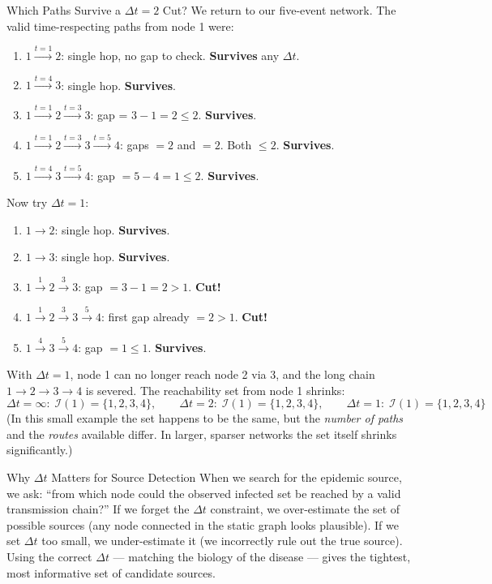 \begin{examplebox}{Which Paths Survive a $\Delta t = 2$ Cut?}
We return to our five-event network. The valid time-respecting paths from node 1 were:
\begin{enumerate}[noitemsep]
  \item $1 \xrightarrow{t=1} 2$: single hop, no gap to check. \textbf{Survives} any $\Delta t$.
  \item $1 \xrightarrow{t=4} 3$: single hop. \textbf{Survives}.
  \item $1 \xrightarrow{t=1} 2 \xrightarrow{t=3} 3$: gap = $3 - 1 = 2 \leq 2$. \textbf{Survives}.
  \item $1 \xrightarrow{t=1} 2 \xrightarrow{t=3} 3 \xrightarrow{t=5} 4$: gaps $= 2$ and $= 2$.
        Both $\leq 2$. \textbf{Survives}.
  \item $1 \xrightarrow{t=4} 3 \xrightarrow{t=5} 4$: gap $= 5 - 4 = 1 \leq 2$. \textbf{Survives}.
\end{enumerate}

Now try $\Delta t = 1$:
\begin{enumerate}[noitemsep]
  \item $1 \to 2$: single hop. \textbf{Survives}.
  \item $1 \to 3$: single hop. \textbf{Survives}.
  \item $1 \xrightarrow{1} 2 \xrightarrow{3} 3$: gap $= 3 - 1 = 2 > 1$. \textbf{Cut!}
  \item $1 \xrightarrow{1} 2 \xrightarrow{3} 3 \xrightarrow{5} 4$: first gap already $=2>1$.
        \textbf{Cut!}
  \item $1 \xrightarrow{4} 3 \xrightarrow{5} 4$: gap $= 1 \leq 1$. \textbf{Survives}.
\end{enumerate}

With $\Delta t = 1$, node 1 can no longer reach node 2 via 3, and the long chain $1 \to 2 \to
3 \to 4$ is severed. The reachability set from node 1 shrinks:
\[
  \Delta t = \infty:\; \mathcal{I}(1) = \{1,2,3,4\}, \qquad
  \Delta t = 2:\; \mathcal{I}(1) = \{1,2,3,4\}, \qquad
  \Delta t = 1:\; \mathcal{I}(1) = \{1,2,3,4\}
\]
(In this small example the set happens to be the same, but the \textit{number of paths} and
the \textit{routes} available differ. In larger, sparser networks the set itself shrinks
significantly.)
\end{examplebox}

\begin{keyinsight}{Why $\Delta t$ Matters for Source Detection}
When we search for the epidemic source, we ask: ``from which node could the observed infected
set be reached by a valid transmission chain?'' If we forget the $\Delta t$ constraint, we
over-estimate the set of possible sources (any node connected in the static graph looks
plausible). If we set $\Delta t$ too small, we under-estimate it (we incorrectly rule out the
true source). Using the correct $\Delta t$ --- matching the biology of the disease --- gives
the tightest, most informative set of candidate sources.
\end{keyinsight}

